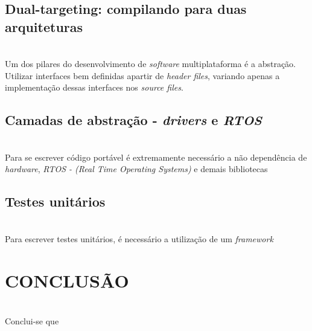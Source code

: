 \documentclass[times, twoside, watermark]{artigo}
\begin{document}
\subsection{Dual-targeting: compilando para duas arquiteturas}\hfill\\

Um dos pilares do desenvolvimento de \textit{software} multiplataforma é a abstração.
Utilizar interfaces bem definidas apartir de \textit{header files}, variando apenas
a implementação dessas interfaces nos \textit{source files}.

\subsection{Camadas de abstração - \textit{drivers} e \textit{RTOS}}\hfill\\

Para se escrever código portável é extremamente necessário a não dependência de 
\textit{hardware}, \textit{RTOS - (Real Time Operating Systems)} e demais bibliotecas

\subsection{Testes unitários}\hfill\\

Para escrever testes unitários, é necessário a utilização de um \textit{framework}


\section{CONCLUSÃO}\hfill\\
Conclui-se que 



\end{document}
